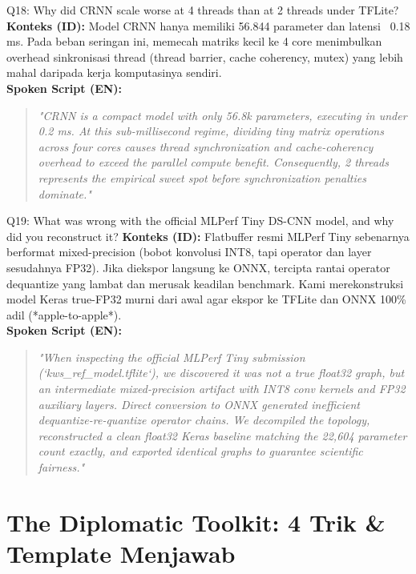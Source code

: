 \documentclass[11pt,a4paper]{article}
\begin{document}
\begin{hardbox}{Q18: Why did CRNN scale worse at 4 threads than at 2 threads under TFLite?}
\textbf{Konteks (ID):} Model CRNN hanya memiliki 56.844 parameter dan latensi ~0.18 ms. Pada beban seringan ini, memecah matriks kecil ke 4 core menimbulkan overhead sinkronisasi thread (thread barrier, cache coherency, mutex) yang lebih mahal daripada kerja komputasinya sendiri.\\
\textbf{Spoken Script (EN):}
\begin{quote}
\small
\textit{"CRNN is a compact model with only 56.8k parameters, executing in under 0.2 ms. At this sub-millisecond regime, dividing tiny matrix operations across four cores causes thread synchronization and cache-coherency overhead to exceed the parallel compute benefit. Consequently, 2 threads represents the empirical sweet spot before synchronization penalties dominate."}
\end{quote}
\end{hardbox}

\begin{hardbox}{Q19: What was wrong with the official MLPerf Tiny DS-CNN model, and why did you reconstruct it?}
\textbf{Konteks (ID):} Flatbuffer resmi MLPerf Tiny sebenarnya berformat mixed-precision (bobot konvolusi INT8, tapi operator dan layer sesudahnya FP32). Jika diekspor langsung ke ONNX, tercipta rantai operator dequantize yang lambat dan merusak keadilan benchmark. Kami merekonstruksi model Keras true-FP32 murni dari awal agar ekspor ke TFLite dan ONNX 100\% adil (*apple-to-apple*).\\
\textbf{Spoken Script (EN):}
\begin{quote}
\small
\textit{"When inspecting the official MLPerf Tiny submission (`kws\_ref\_model.tflite`), we discovered it was not a true float32 graph, but an intermediate mixed-precision artifact with INT8 conv kernels and FP32 auxiliary layers. Direct conversion to ONNX generated inefficient dequantize-re-quantize operator chains. We decompiled the topology, reconstructed a clean float32 Keras baseline matching the 22,604 parameter count exactly, and exported identical graphs to guarantee scientific fairness."}
\end{quote}
\end{hardbox}

\newpage
\section*{\textcolor{NavyBlue}{\Large The Diplomatic Toolkit: 4 Trik \& Template Menjawab}}
\end{document}
